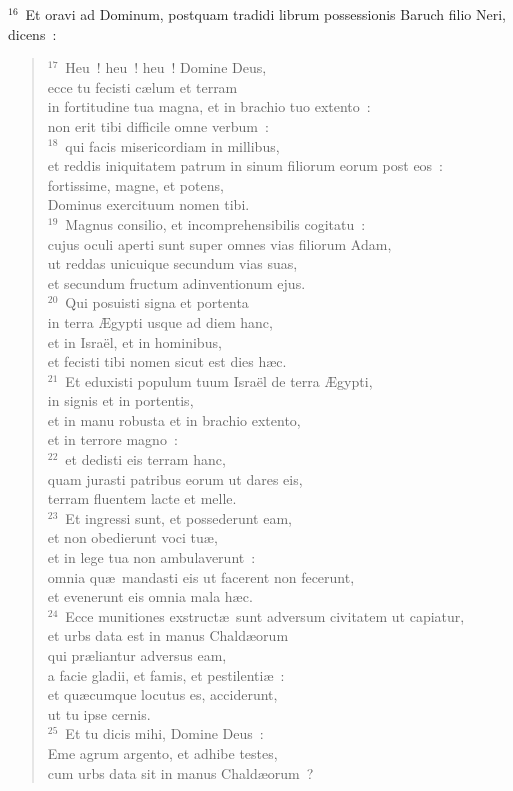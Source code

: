 ${}^{16}$~Et oravi ad Dominum, postquam tradidi librum possessionis Baruch filio Neri, dicens~:
\begin{flushleft}\begin{verse}${}^{17}$~Heu~! heu~! heu~! Domine Deus,\\ ecce tu fecisti c\ae lum et terram\\ in fortitudine tua magna, et in brachio tuo extento~:\\ non erit tibi difficile omne verbum~:\\
${}^{18}$~qui facis misericordiam in millibus,\\ et reddis iniquitatem patrum in sinum filiorum eorum post eos~:\\ fortissime, magne, et potens,\\ Dominus exercituum nomen tibi.\\
${}^{19}$~Magnus consilio, et incomprehensibilis cogitatu~:\\ cujus oculi aperti sunt super omnes vias filiorum Adam,\\ ut reddas unicuique secundum vias suas,\\ et secundum fructum adinventionum ejus.\\
${}^{20}$~Qui posuisti signa et portenta\\ in terra \AE gypti usque ad diem hanc,\\ et in Isra\"el, et in hominibus,\\ et fecisti tibi nomen sicut est dies h\ae c.\\
${}^{21}$~Et eduxisti populum tuum Isra\"el de terra \AE gypti,\\ in signis et in portentis,\\ et in manu robusta et in brachio extento,\\ et in terrore magno~:\\
${}^{22}$~et dedisti eis terram hanc,\\ quam jurasti patribus eorum ut dares eis,\\ terram fluentem lacte et melle.\\
${}^{23}$~Et ingressi sunt, et possederunt eam,\\ et non obedierunt voci tu\ae ,\\ et in lege tua non ambulaverunt~:\\ omnia qu\ae\ mandasti eis ut facerent non fecerunt,\\ et evenerunt eis omnia mala h\ae c.\\
${}^{24}$~Ecce munitiones exstruct\ae\ sunt adversum civitatem ut capiatur,\\ et urbs data est in manus Chald\ae orum\\ qui pr\ae liantur adversus eam,\\ a facie gladii, et famis, et pestilenti\ae~:\\ et qu\ae cumque locutus es, acciderunt,\\ ut tu ipse cernis.\\
${}^{25}$~Et tu dicis mihi, Domine Deus~:\\ Eme agrum argento, et adhibe testes,\\ cum urbs data sit in manus Chald\ae orum~?\end{verse}\end{flushleft}
